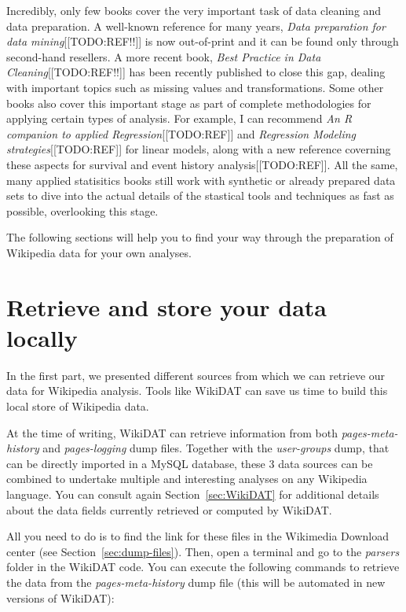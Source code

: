 Incredibly, only few books cover the very important task of data cleaning and
data preparation. A well-known reference for many years, \textit{Data preparation
for data mining}[[TODO:REF!!]] is now out-of-print and it can be found only through second-hand
resellers. A more recent book, \textit{Best Practice in Data Cleaning}[[TODO:REF!!]]
has been recently published to close this gap, dealing with important topics such
as missing values and transformations. Some other books also cover this important
stage as part of complete methodologies for applying certain types of analysis.
For example, I can recommend \textit{An R companion to applied Regression}[[TODO:REF]] and
\textit{Regression Modeling strategies}[[TODO:REF]] for linear models, along with
a new reference coverning these aspects for survival and event history analysis[[TODO:REF]].
All the same, many applied statisitics books still work with synthetic or already
prepared data sets to dive into the actual details of the stastical tools and
techniques as fast as possible, overlooking this stage.

The following sections will help you to find your way through the preparation of
Wikipedia data for your own analyses.

\section{Retrieve and store your data locally}
\label{sec:retrieve-store}
In the first part, we presented different sources from which we can retrieve our
data for Wikipedia analysis. Tools like WikiDAT can save us time to build this
local store of Wikipedia data.

At the time of writing, WikiDAT can retrieve information from both \textit{pages-meta-history}
and \textit{pages-logging} dump files. Together with the \textit{user-groups} dump,
that can be directly imported in a MySQL database, these 3 data sources can be
combined to undertake multiple and interesting analyses on any Wikipedia language.
You can consult again Section~\ref{sec:WikiDAT} for additional details about the
data fields currently retrieved or computed by WikiDAT.

All you need to do is to find the link for these files in the Wikimedia Download
center (see Section~\ref{sec:dump-files}). Then, open a terminal and go to the
\textit{parsers} folder in the WikiDAT code. You can execute the following
commands to retrieve the data from the \textit{pages-meta-history} dump file
(this will be automated in new versions of WikiDAT):

